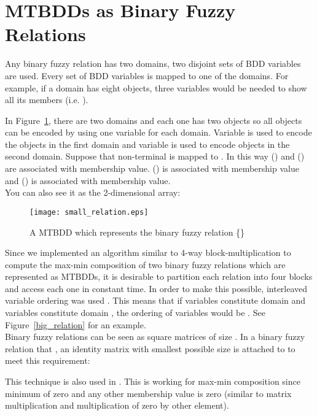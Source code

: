 \documentclass[4pt]{article}
\begin{document}
\section{MTBDDs as Binary Fuzzy Relations}
\label{mtbdd_fuzzyrelation}
Any binary fuzzy relation has two domains, two disjoint sets of BDD variables are used. Every set of BDD variables is mapped to one of the domains. For example, if a domain has eight objects, three variables would be needed to show all its members (i.e. ).

In Figure~\ref{small_relation}, there are two domains and each one has two objects so all objects can be encoded by using one variable for each domain. Variable  is used to encode the objects in the first domain and variable  is used to encode objects in the second domain. Suppose that non-terminal  is mapped to . In this way () and () are associated with  membership value. () is associated with  membership value and () is associated with  membership value. \\
You can also see it as the 2-dimensional array:\\
\begin{center}

\end{center}

\begin{figure}
\begin{center}
\texttt{[image: small\_relation.eps]}
\end{center}
\caption{A MTBDD which represents the binary fuzzy relation \{\}}
\label{small_relation}
\end{figure}
Since we implemented an algorithm similar to 4-way block-multiplication to compute the max-min composition of two binary fuzzy relations which are represented as MTBDDs, it is desirable to partition each relation into four blocks and access each one in constant time. In order to make this possible, interleaved variable ordering was used \cite{mtbdd}. This means that if variables  constitute domain  and variables  constitute domain , the ordering of variables would be . See Figure~\ref{big_relation} for an example.\\
Binary fuzzy relations can be seen as square matrices of size . In a binary fuzzy relation  that , an identity matrix with smallest possible size is attached to  to meet this requirement:\\
\begin{center}

\end{center}
This technique is also used in \cite{mtbdd}. This is working for max-min composition since minimum of zero and any other membership value is zero (similar to matrix multiplication and multiplication of zero by other element).
\end{document}
